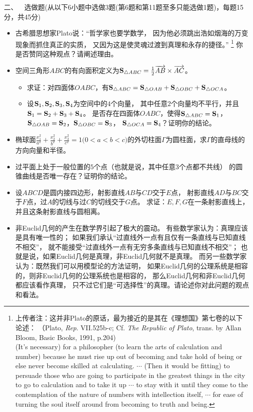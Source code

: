 二、\ \ 选做题(从以下6小题中选做3题(第6题和第11题至多只能选做1题)，每题15分，共45分)
\begin{itemize}
    \item[6.] 古希腊思想家Plato说：``哲学家也要学数学，
    因为他必须跳出浩如烟海的万变现象而抓住真正的实质，
    又因为这是使灵魂过渡到真理和永存的捷径。''
    \footnote{上传者注：这并非Plato的原话，最为接近的是其在《理想国》第七卷的以下论述：
    （Plato, \textit{Rep}. VII.525b-c; Cf. \textit{The Republic of Plato}, 
    trans. by Allan Bloom, Basic Books, 1991, p.204)\\
        \quad (It's necessary) for a philosopher 
        (to learn the arts of calculation and number) 
        because he must rise up out of becoming 
        and take hold of being or else never become skilled at calculating.
        $\cdots$ (Then it would be fitting) to persuade those 
        who are going to participate in the greatest things in the city 
        to go to calculation and to take it up $\cdots$ to stay with it 
        until they come to the contemplation of the nature of numbers 
        with intellection itself, $\cdots$ for ease of 
        turning the soul itself around from becoming to truth and being.}
    你是否赞同这种观点？请阐述理由。
    \printfootnotes
    \item[7.] 空间三角形$ABC$的有向面积定义为$\mathbf{S}_{\triangle ABC}
    =\frac{1}{2}\overrightarrow{AB}\times\overrightarrow{AC}$。
    \begin{itemize}
        \item[(a)] 求证：对四面体$OABC$，有$\mathbf{S}_{\triangle ABC}
        =\mathbf{S}_{\triangle OAB}+\mathbf{S}_{\triangle OBC}+\mathbf{S}_{\triangle OCA}$。
        \item[(b)] 设$\mathbf{S}_1,\mathbf{S}_2,\mathbf{S}_3,\mathbf{S}_4$为空间中的$4$个向量，
        其中任意$2$个向量均不平行，并且$\mathbf{S}_1=\mathbf{S}_2+\mathbf{S}_3+\mathbf{S}_4$。
        是否存在四面体$OABC$，使得$\mathbf{S}_{\triangle ABC}=\mathbf{S}_1$，
        $\mathbf{S}_{\triangle OAB}=\mathbf{S}_2$，$\mathbf{S}_{\triangle OBC}=\mathbf{S}_3$，
        $\mathbf{S}_{\triangle OCA}=\mathbf{S}_4$？证明你的结论。
    \end{itemize}
    \item[8.] 椭球面$\frac{x_1^2}{a^2}+\frac{x_2^2}{b^2}+\frac{x_3^2}{c^2}=1
    \big(0<a<b<c\big)$的外切柱面$\Gamma$为圆柱面，求$\Gamma$的直母线的方向向量和半径。
    \item[9.] 过平面上处于一般位置的$5$个点（也就是说，其中任意$3$个点都不共线）
    的圆锥曲线是否唯一存在？证明你的结论。
    \item[10.] 设$ABCD$是圆内接四边形，射影直线$AB$与$CD$交于$E$点，
    射影直线$AD$与$BC$交于$F$点，过$A$的切线与过$C$的切线交于$G$点。
    求证：$E,F,G$在一条射影直线上，并且这条射影直线与圆相离。
    \item[11.] 非Euclid几何的产生在数学界引起了极大的震动。
    有些数学家认为：真理应该是具有唯一性的；
    如果我们承认``过直线外一点有且仅有一条直线与已知直线不相交''，
    就不能接受``过直线外一点有无穷多条直线与已知直线不相交''；
    也就是说，如果Euclid几何是真理，非Euclid几何就不是真理。
    而另一些数学家认为：既然我们可以用模型论的方法证明，
    如果Euclid几何的公理系统是相容的，则非Euclid几何的公理系统也是相容的，
    那么Euclid几何和非Euclid几何都应该看作真理，
    只不过它们是``可选择性''的真理。请论述你对此问题的观点和看法。
\end{itemize}
